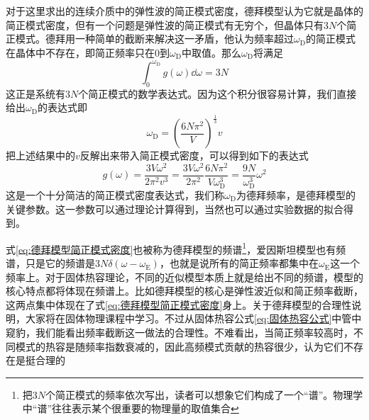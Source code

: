 \documentclass[../../main.tex]{subfiles}
\begin{document}
对于这里求出的连续介质中的弹性波的简正模式密度，德拜模型认为它就是晶体的简正模式密度，但有一个问题是弹性波的简正模式有无穷个，但晶体只有\(3N\)个简正模式。德拜用一种简单的截断来解决这一矛盾，他认为频率超过\(\omega_{\mathrm{D}}\)的简正模式在晶体中不存在，即简正频率只在0到\(\omega_{\mathrm{D}}\)中取值。那么\(\omega_{\mathrm{D}}\)将满足
\begin{equation}
    \int_0^{\omega_{\mathrm{D}}}g(\omega)\dd\omega=3N
\end{equation}
这正是系统有\(3N\)个简正模式的数学表达式。因为这个积分很容易计算，我们直接给出\(\omega_{\mathrm{D}}\)的表达式即
\begin{equation}
    \omega_{\mathrm{D}}=\left(\frac{6N\pi^2}{V}\right)^{\frac{1}{3}}v
\end{equation}
把上述结果中的\(v\)反解出来带入简正模式密度，可以得到如下的表达式
\begin{equation}\label{eq:德拜模型简正模式密度}
    g(\omega)=\frac{3V\omega^2}{2\pi^2v^3}=\frac{3V\omega^2}{2\pi^2}\frac{6N\pi^2}{V\omega_{\mathrm{D}}^3}=\frac{9N}{\omega_{\mathrm{D}}^3}\omega^2
\end{equation}
这是一个十分简洁的简正模式密度表达式，我们称\(\omega_{\mathrm{D}}\)为德拜频率，是德拜模型的关键参数。这一参数可以通过理论计算得到，当然也可以通过实验数据的拟合得到。

式\eqref{eq:德拜模型简正模式密度}也被称为德拜模型的频谱\footnote{把\(3N\)个简正模式的频率依次写出，读者可以想象它们构成了一个“谱”。物理学中“谱”往往表示某个很重要的物理量的取值集合}，爱因斯坦模型也有频谱，只是它的频谱是\(3N\delta(\omega-\omega_{\mathrm{E}})\)，也就是说所有的简正频率都集中在\(\omega_{\mathrm{E}}\)这一个频率上。对于固体热容理论，不同的近似模型本质上就是给出不同的频谱，模型的核心特点都将体现在频谱上。比如德拜模型的核心是弹性波近似和简正频率截断，这两点集中体现在了式\eqref{eq:德拜模型简正模式密度}身上。关于德拜模型的合理性说明，大家将在固体物理课程中学习。不过从固体热容公式\eqref{eq:固体热容公式}中管中窥豹，我们能看出频率截断这一做法的合理性。不难看出，当简正频率较高时，不同模式的热容是随频率指数衰减的，因此高频模式贡献的热容很少，认为它们不存在是挺合理的
\end{document}
